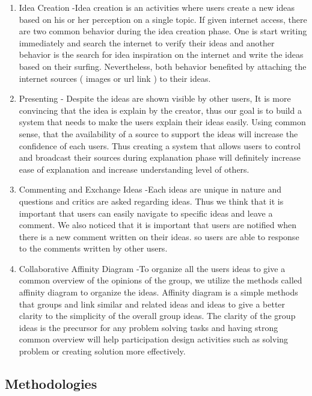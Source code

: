\documentclass{sigchi}
\begin{document}
\begin{itemize}
\begin{itemize}
\begin{enumerate}
\item Idea Creation -Idea creation is an activities where users create a new ideas based on his or her perception on a single topic. If given internet access, there are two common behavior during the idea creation phase. One is start  writing immediately and search the internet to verify their ideas and another behavior is the search for idea inspiration on the internet and write the ideas based on their surfing. Nevertheless, both behavior benefited by attaching the internet sources ( images or url link ) to their ideas. 
\item Presenting - Despite the ideas are shown visible by other users, It is more convincing that the idea is explain by the creator, thus our goal is to build a system that needs to make the users explain their ideas easily. Using common sense, that the availability of a source to support the ideas will increase the confidence of each users. Thus creating a system that allows users to control and broadcast their sources during explanation phase will definitely increase ease of explanation and increase understanding level of others. 
\item Commenting and Exchange Ideas -Each ideas are unique in nature and questions and critics are asked regarding ideas. Thus we think that it is important that users can easily navigate to specific ideas and leave a comment. We also noticed that it is important that users are notified when there is a new comment written on their ideas. so users are able to response to the comments written by other users. 
\item Collaborative Affinity Diagram -To organize all the users ideas to give a common overview of the opinions of the group, we utilize the methods called affinity diagram to organize the ideas. Affinity diagram is a simple methods that groups and link similar and related ideas and ideas to give a better clarity to the simplicity of the overall group ideas. The clarity of the group ideas is the precursor for any problem solving tasks and having strong common overview will help participation design activities such as solving problem or creating solution more effectively. 
\end{enumerate}

\subsection{Methodologies}


\end{itemize}
\end{itemize}
\end{document}
